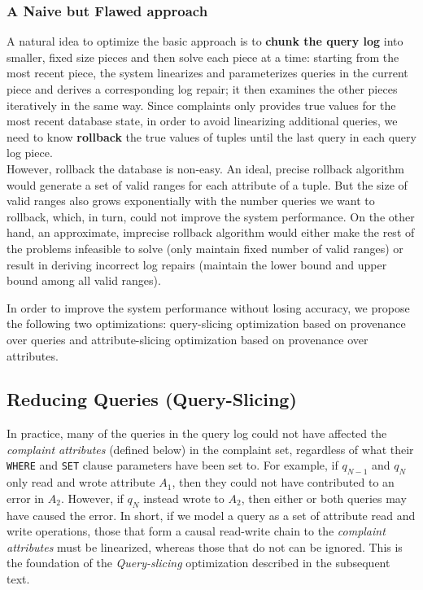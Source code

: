   \subsubsection{A Naive but Flawed approach}
  A natural idea to optimize the basic approach is 
  to \textbf{chunk the query log} into
  smaller, fixed size pieces and then solve each piece at a time: starting
  from the most recent piece, the system linearizes and parameterizes queries 
  in the current piece and derives a corresponding log repair; 
  it then examines the other pieces iteratively
  in the same way. Since complaints only provides
  true values for the most recent database state, in order to avoid 
  linearizing additional queries, 
  we need to know \textbf{rollback} the true values of tuples 
  until the last query in each query log piece. \\
  However, rollback the database is non-easy. An ideal, precise rollback
  algorithm would generate a set of valid ranges for each attribute of a tuple. 
  But the size of valid ranges also grows exponentially with the number queries
  we want to rollback, which, in turn, could not improve the system performance. 
  On the other hand, an approximate, imprecise 
  rollback algorithm would either make the rest of the problems
  infeasible to solve (only maintain fixed number of valid ranges) 
  or result in deriving 
  incorrect log repairs (maintain the lower 
  bound and upper bound among all valid ranges).
    

  In order to improve the system performance without losing accuracy, we propose
  the following two optimizations: query-slicing optimization 
  based on provenance over queries and
  attribute-slicing optimization based on provenance over 
  attributes. 
\fi





\subsection{Reducing Queries (Query-Slicing)}
\label{sec:opt:query}


In practice, many of the queries in the query log could not have affected the 
{\it complaint attributes} (defined below) in the complaint set, regardless of what their \texttt{WHERE} 
and \texttt{SET} clause parameters have been set to. For example, if $q_{N-1}$ and $q_{N}$ 
only read and wrote attribute $A_1$, then they could not have contributed to an error in $A_2$.  
However, if $q_{N}$ instead wrote to $A_2$, then either or both queries may have caused the error. 
In short, if we model a query as a set of attribute read and write operations, those that form a 
causal read-write chain to the {\it complaint attributes} must be linearized, whereas those that
do not can be ignored.  This is the foundation of the {\it Query-slicing} optimization described in 
the subsequent text.

